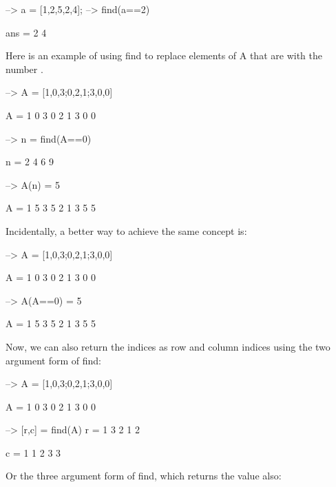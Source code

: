 \begin{DoxyVerbInclude}
--> a = [1,2,5,2,4];
--> find(a==2)

ans = 
 2 4 
\end{DoxyVerbInclude}


Here is an example of using find to replace elements of {\ttfamily A} that are {} with the number {}.


\begin{DoxyVerbInclude}
--> A = [1,0,3;0,2,1;3,0,0]

A = 
 1 0 3 
 0 2 1 
 3 0 0 

--> n = find(A==0)

n = 
 2 
 4 
 6 
 9 

--> A(n) = 5

A = 
 1 5 3 
 5 2 1 
 3 5 5 
\end{DoxyVerbInclude}


Incidentally, a better way to achieve the same concept is\-:


\begin{DoxyVerbInclude}
--> A = [1,0,3;0,2,1;3,0,0]

A = 
 1 0 3 
 0 2 1 
 3 0 0 

--> A(A==0) = 5

A = 
 1 5 3 
 5 2 1 
 3 5 5 
\end{DoxyVerbInclude}


Now, we can also return the indices as row and column indices using the two argument form of {\ttfamily find}\-:


\begin{DoxyVerbInclude}
--> A = [1,0,3;0,2,1;3,0,0]

A = 
 1 0 3 
 0 2 1 
 3 0 0 

--> [r,c] = find(A)
r = 
 1 
 3 
 2 
 1 
 2 

c = 
 1 
 1 
 2 
 3 
 3 
\end{DoxyVerbInclude}


Or the three argument form of {\ttfamily find}, which returns the value also\-:


